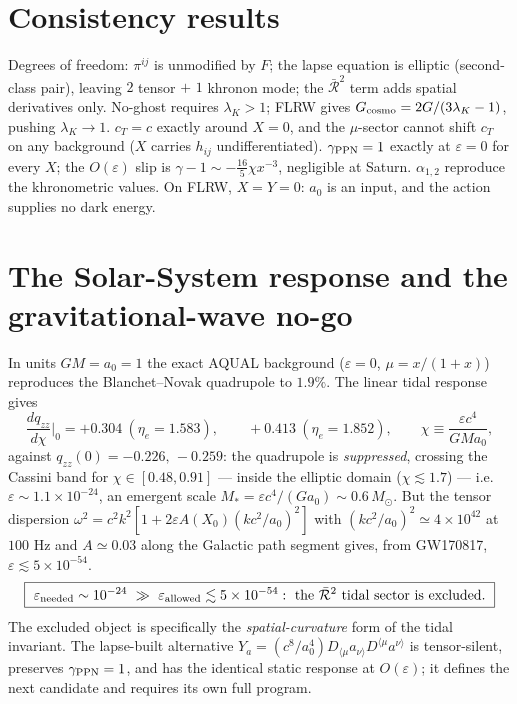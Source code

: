 \documentclass[11pt]{article}
\begin{document}
\section{Consistency results}
Degrees of freedom: $\pi^{ij}$ is unmodified by $F$; the lapse equation is elliptic
(second-class pair), leaving $2$ tensor $+$ $1$ khronon mode; the $\bar{\mathcal R}^2$
term adds spatial derivatives only.  No-ghost requires $\lambda_K>1$; FLRW gives
$G_{\rm cosmo}=2G/(3\lambda_K-1)$, pushing $\lambda_K\to1$.  $c_T=c$ exactly around
$X=0$, and the $\mu$-sector cannot shift $c_T$ on any background ($X$ carries $h_{ij}$
undifferentiated).  $\gamma_{\rm PPN}=1$ exactly at $\varepsilon=0$ for every $X$;
the $O(\varepsilon)$ slip is $\gamma-1\sim-\tfrac{16}{5}\chi x^{-3}$, negligible at
Saturn.  $\alpha_{1,2}$ reproduce the khronometric values.  On FLRW, $X=Y=0$: $a_0$ is
an input, and the action supplies no dark energy.

\section{The Solar-System response and the gravitational-wave no-go}
In units $GM=a_0=1$ the exact AQUAL background ($\varepsilon=0$, $\mu=x/(1+x)$)
reproduces the Blanchet--Novak quadrupole to $1.9\%$.  The linear tidal response gives
\begin{equation}
\frac{dq_{zz}}{d\chi}\Big|_0=+0.304\ (\eta_e=1.583),\qquad +0.413\ (\eta_e=1.852),
\qquad \chi\equiv\frac{\varepsilon c^4}{GMa_0},
\end{equation}
against $q_{zz}(0)=-0.226,\,-0.259$: the quadrupole is \emph{suppressed}, crossing the
Cassini band for $\chi\in[0.48,0.91]$ --- inside the elliptic domain ($\chi\lesssim1.7$)
--- i.e.\ $\varepsilon\sim1.1\times10^{-24}$, an emergent scale
$M_*=\varepsilon c^4/(Ga_0)\sim0.6\,M_\odot$.  But the tensor dispersion
$\omega^2=c^2k^2[1+2\varepsilon A(X_0)(kc^2/a_0)^2]$ with
$(kc^2/a_0)^2\simeq4\times10^{42}$ at $100$ Hz and $A\simeq0.03$ along the Galactic path
segment gives, from GW170817, $\varepsilon\lesssim5\times10^{-54}$.
\begin{equation}
\boxed{\ \varepsilon_{\rm needed}\sim10^{-24}\ \gg\ \varepsilon_{\rm allowed}
\lesssim5\times10^{-54}:\ \text{the }\bar{\mathcal R}^2\text{ tidal sector is excluded.}\ }
\end{equation}
The excluded object is specifically the \emph{spatial-curvature} form of the tidal
invariant.  The lapse-built alternative
$Y_a=(c^8/a_0^4)D_{\langle\mu}a_{\nu\rangle}D^{\langle\mu}a^{\nu\rangle}$ is
tensor-silent, preserves $\gamma_{\rm PPN}=1$, and has the identical static response at
$O(\varepsilon)$; it defines the next candidate and requires its own full program.
\end{document}
